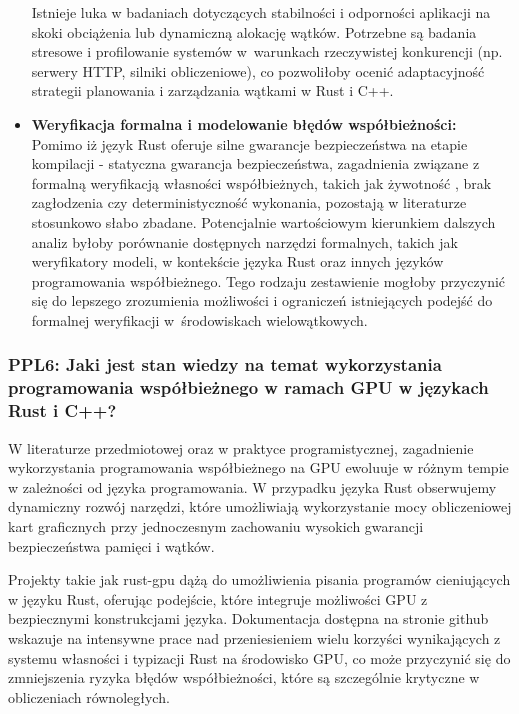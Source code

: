 \begin{itemize}
    Istnieje luka w badaniach dotyczących stabilności i odporności aplikacji na skoki obciążenia lub dynamiczną alokację wątków. Potrzebne są badania stresowe i profilowanie systemów w~warunkach rzeczywistej konkurencji (np. serwery HTTP, silniki obliczeniowe), co pozwoliłoby ocenić adaptacyjność strategii planowania i zarządzania wątkami w Rust i C++.
    \item \textbf{Weryfikacja formalna i modelowanie błędów współbieżności:}\\
    Pomimo iż język Rust oferuje silne gwarancje bezpieczeństwa na etapie kompilacji - statyczna gwarancja bezpieczeństwa, zagadnienia związane z formalną weryfikacją własności współbieżnych, takich jak żywotność , brak zagłodzenia  czy deterministyczność wykonania, pozostają w literaturze stosunkowo słabo zbadane. Potencjalnie wartościowym kierunkiem dalszych analiz byłoby porównanie dostępnych narzędzi formalnych, takich jak weryfikatory modeli, w kontekście języka Rust oraz innych języków programowania współbieżnego. Tego rodzaju zestawienie mogłoby przyczynić się do lepszego zrozumienia możliwości i ograniczeń istniejących podejść do formalnej weryfikacji w~środowiskach wielowątkowych.
\end{itemize}


\subsubsection{PPL6: Jaki jest stan wiedzy na temat wykorzystania programowania współbieżnego w ramach GPU w językach Rust i C++?}
W literaturze przedmiotowej oraz w praktyce programistycznej, zagadnienie wykorzystania programowania współbieżnego na GPU ewoluuje w różnym tempie w zależności od języka programowania. W przypadku języka Rust obserwujemy dynamiczny rozwój narzędzi, które umożliwiają wykorzystanie mocy obliczeniowej kart graficznych przy jednoczesnym zachowaniu wysokich gwarancji bezpieczeństwa pamięci i wątków.

Projekty takie jak rust-gpu \cite{rustgpuRust} dążą do umożliwienia pisania programów cieniujących w języku Rust, oferując podejście, które integruje możliwości GPU z bezpiecznymi konstrukcjami języka. Dokumentacja dostępna na stronie github \cite{rustgpuRust} wskazuje na intensywne prace nad przeniesieniem wielu korzyści wynikających z systemu własności i typizacji Rust na środowisko GPU, co może przyczynić się do zmniejszenia ryzyka błędów współbieżności, które są szczególnie krytyczne w obliczeniach równoległych.

